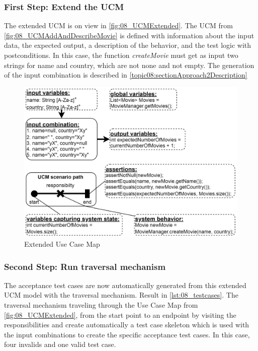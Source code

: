 \subsubsection{First Step: Extend the UCM}
The extended UCM is on view in \autoref{fig:08_UCMExtended}. The UCM from \autoref{fig:08_UCMAddAndDescribeMovie} is defined with information about the input
data, the expected output, a description of the behavior, and the test logic with postconditions. In this case, the function \textit{createMovie} must get as input two strings for name and country, which are not none and not empty. The generation of the input combination is described in \autoref{topic08:sectionApproach2Description}

\begin{figure}[h!]
	\centering
	\includegraphics[scale=0.43]{../images/08/08_UCMExtended.jpg} 
	\caption{Extended Use Case Map}
	\label{fig:08_UCMExtended}
\end{figure}

\subsubsection{Second Step: Run traversal mechanism}
The acceptance test cases are now automatically generated from this extended UCM model with the traversal mechanism. Result in \autoref{lst:08_testcases}. The traversal mechanism traveling through the Use Case Map from \autoref{fig:08_UCMExtended}, from the start point to an endpoint by visiting the responsibilities and create automatically a test case skeleton which is used with the input combinations to create the specific acceptance test cases. In this case, four invalids and one valid test case.

